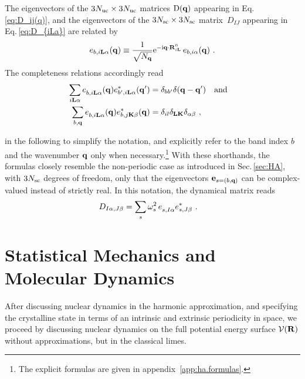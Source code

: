 The eigenvectors of the $3N_{\rm uc} \times 3N_{\rm uc}$ matrices $\mathrm D ({\bf q})$ appearing in Eq.\,\eqref{eq:D_ij(q)}, and the eigenvectors of the $3N_{\rm sc} \times 3N_{\rm sc}$ matrix~$D_{IJ}$ appearing in Eq.\,\eqref{eq:D_{iLa}} are related by
\begin{align}
	e_{b, i {\bf L} \alpha} ({\bf q})
		\equiv \frac{1}{\sqrt{N_{{\bf q}}}} {\rm e}^{- {\rm i} {\bf q}  \cdot {\bf R}^0_{i {\bf L}}} \, e_{b, i \alpha} ({\bf q})~.
\end{align}
The completeness relations accordingly read
\begin{align}
	\sum_{i \b L \alpha} \fD e_{b, i \b L \alpha} (\b q) e^\ast_{b', i \b L \alpha} (\b q') 
		&= \delta_{b b'} \delta (\b q - \b q') \quad \text{and} \quad \\
	\sum_{b, \b q} \fD e_{b, i \b L \alpha} (\b q) e^\ast_{b, j \b K \beta} (\b q)
		&= \delta_{il} \delta_{\b L \b K} \delta_{\alpha \beta}~,
	\label{eq:completeness.e_bq}
\end{align}

 in the following to simplify the notation, and explicitly refer to the band index $b$ and the wavenumber ${\bf q}$ only when necessary.\footnote{The explicit formulas are given in appendix~\ref{app:ha.formulas}.}
With these shorthands, the formulas closely resemble the non-periodic case as introduced in Sec.\,\ref{sec:HA}, with $3N_{\rm sc}$ degrees of freedom, only that the eigenvectors ${\bf e}_{s = (b, {\bf q})}$ can be complex-valued instead of strictly real. In this notation, the dynamical matrix reads
\begin{align}
D_{I \alpha, J \beta}
&= \sum_s \omega^{2}_{s \vphantom I} \, \fD e_{s, I \alpha} e^\ast_{s, J \beta}~.
\end{align}




\newpage

\section{Statistical Mechanics and Molecular Dynamics}
After discussing nuclear dynamics in the harmonic approximation, and specifying the crystalline state in terms of an intrinsic and extrinsic periodicity in space, we proceed by discussing nuclear dynamics on the full potential energy surface $\mathcal{V} ({\bf R})$ without approximations, but in the classical limes.

